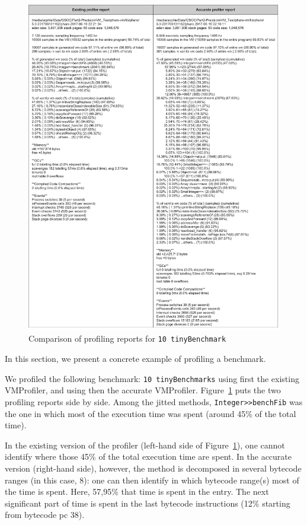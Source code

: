 \documentclass[10pt,preprint,nonatbib]{sigplanconf}
\newcommand{\ct}{\lstinline[backgroundcolor=\color{white},basicstyle=\small\ttfamily]}
\newcommand{\figlabel}[1]{\label{fig:#1}}
\newcommand{\figref}[1]{Figure~\ref{fig:#1}}
\begin{document}
  \begin{figure}[!htp]
     \begin{center}
         \includegraphics[width=1.0\linewidth]{ReportComparison}
         \caption{Comparison of profiling reports for \ct{10 tinyBenchmark}}
         \figlabel{fig:ReportComparison}
     \end{center}
 \end{figure}

In this section, we present a concrete example of profiling a benchmark.

We profiled the following benchmark: \ct{10 tinyBenchmarks} using first the existing VMProfiler, and using then the accurate VMProfiler. 
\figref{fig:ReportComparison} puts the two profiling reports side by side.
Among the jitted methods, \ct{Integer>>benchFib} was the one in which most of the execution time was spent (around 45\% of the total time).

In the existing version of the profiler (left-hand side of \figref{fig:ReportComparison}), one cannot identify where those 45\% of the total execution time are spent. In the accurate version (right-hand side), however, the method is decomposed in several bytecode ranges (in this case, 8): one can then identify in which bytecode range(s) most of the time is spent. Here, 57,95\% that time is spent in the entry. The next significant part of time is spent in the last bytecode instructions (12\% starting from bytecode pc 38).
\end{document}
